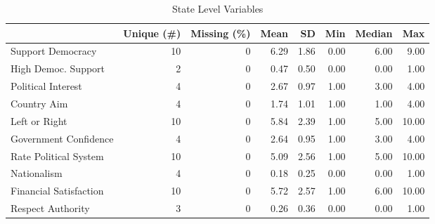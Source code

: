 \begin{table}

\caption{\label{tab:}State Level Variables}
\centering
\begin{tabular}[t]{lrrrrrrr}
\toprule
  & Unique (\#) & Missing (\%) & Mean & SD & Min & Median & Max\\
\midrule
Support Democracy & 10 & 0 & 6.29 & 1.86 & 0.00 & 6.00 & 9.00\\
High Democ. Support & 2 & 0 & 0.47 & 0.50 & 0.00 & 0.00 & 1.00\\
Political Interest & 4 & 0 & 2.67 & 0.97 & 1.00 & 3.00 & 4.00\\
Country Aim & 4 & 0 & 1.74 & 1.01 & 1.00 & 1.00 & 4.00\\
Left or Right & 10 & 0 & 5.84 & 2.39 & 1.00 & 5.00 & 10.00\\
Government Confidence & 4 & 0 & 2.64 & 0.95 & 1.00 & 3.00 & 4.00\\
Rate Political System & 10 & 0 & 5.09 & 2.56 & 1.00 & 5.00 & 10.00\\
Nationalism & 4 & 0 & 0.18 & 0.25 & 0.00 & 0.00 & 1.00\\
Financial Satisfaction & 10 & 0 & 5.72 & 2.57 & 1.00 & 6.00 & 10.00\\
Respect Authority & 3 & 0 & 0.26 & 0.36 & 0.00 & 0.00 & 1.00\\
\bottomrule
\end{tabular}
\end{table}
